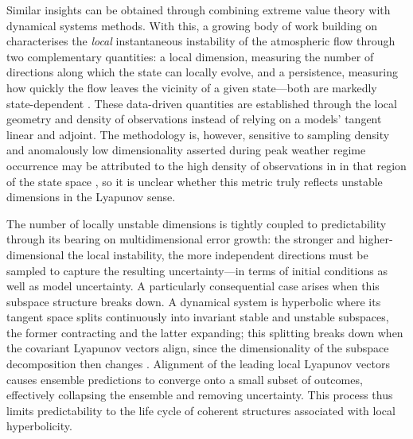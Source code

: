 Similar insights can be obtained through combining extreme value
theory with dynamical systems methods. With this, a growing body of work building on
\textcite{lucariniExtremesRecurrenceDynamical2016} characterises the
\emph{local} instantaneous instability of the atmospheric flow through two
complementary quantities: a local dimension, measuring the number of
directions along which the state can locally evolve, and a persistence,
measuring how quickly the flow leaves the vicinity of a given state---both are
markedly state-dependent \parencite{messoriDynamicalSystemsApproach2017,
    leeDynamicalFootprintYearround2024,hochmanAtlanticeuropeanWeatherRegimes2021,
    holmbergLinkEuropeanWarmtemperature2023}.
These data-driven quantities are established through the local geometry and
density of observations instead of relying on a models' tangent linear and
adjoint. The methodology is, however, sensitive to sampling density and
anomalously low dimensionality asserted during peak weather regime occurrence
may be attributed to the high density of observations in in that region of the
state space \parencite{platzerDisentanglingDensityGeometry2025}, so it is
unclear whether this metric truly reflects unstable dimensions in the
Lyapunov sense.

The number of locally unstable dimensions is tightly coupled to
predictability through its bearing on multidimensional error growth: the
stronger and higher-dimensional the local instability, the more independent
directions must be sampled to capture the resulting uncertainty---in terms of
initial conditions as well as model uncertainty. A particularly consequential
case arises when this subspace structure breaks
down. A dynamical system is hyperbolic where its tangent space splits
continuously into invariant stable and unstable subspaces, the former
contracting and the latter expanding; this splitting breaks down when the
covariant Lyapunov vectors align, since the dimensionality of the subspace
decomposition then changes \parencite{beimsAlignmentLyapunovVectors2016,
    sharafiCriticalTransitionsPerturbation2017,
    lucariniNewMathematicalFramework2020, axelsenHyperbolicitySouthernHemisphere2025}.
Alignment of the leading local Lyapunov vectors causes ensemble predictions
to converge onto a small subset of outcomes, effectively collapsing the
ensemble and removing uncertainty. This process thus limits predictability
to the life cycle of coherent structures associated with local hyperbolicity.

